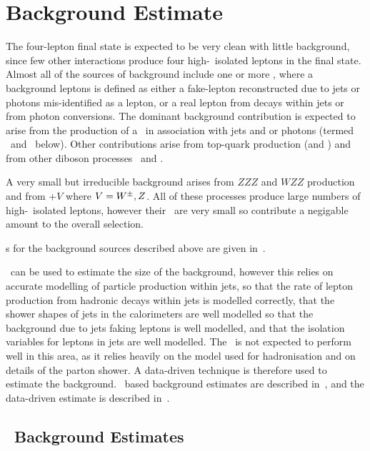 \graphicspath{{Chapters/BackgroundEstimate/Figures/}}
\chapter{Background Estimate}
\label{chap:BackgroundEstimate}

The four-lepton final state is expected to be very clean with little
background, since few other interactions produce four high-\pt\ isolated leptons
in the final state. Almost all of the sources of background include one or more
, where a background
leptons is defined as either a fake-lepton reconstructed due to jets or
photons mis-identified as a lepton, or a real lepton from decays within jets or
from photon conversions.
The dominant background contribution is expected to arise from the production of a \Z\ in
association with jets and or photons (termed \Zjets\ and \Zgamma\ below). Other
contributions arise from top-quark production (\ttbar and \singletop) and from
other diboson processes \WW\ and \WZ.

A very small but irreducible background arises from $ZZZ$ and $WZZ$ production
and from \ttbar+$V$ where $V=W^{\pm},Z$.
All of these processes produce large numbers of high-\pt\ isolated leptons,
however their \cx\ are very small so contribute a negigable amount to the
overall selection.

\CX s for the background sources described above are given in~\tab{}.

\mcsim\ can be used to estimate the size of the background, however this relies
on accurate modelling of particle production within jets, so that the rate of
lepton production from hadronic decays within jets is modelled correctly, 
that the shower shapes of jets in the calorimeters are well modelled so that the
background due to jets faking leptons is well modelled, and that the isolation
variables for leptons in jets are well modelled. The \mc\ is not expected to
perform well in this area, as it relies heavily on the model used for
hadronisation and on details of the parton shower. A data-driven technique is
therefore used to estimate the background. \mc\ based background estimates are
described in~, and the data-driven estimate is described in~.

\section{\mc\ Background Estimates}
\label{sec:mcbg}

